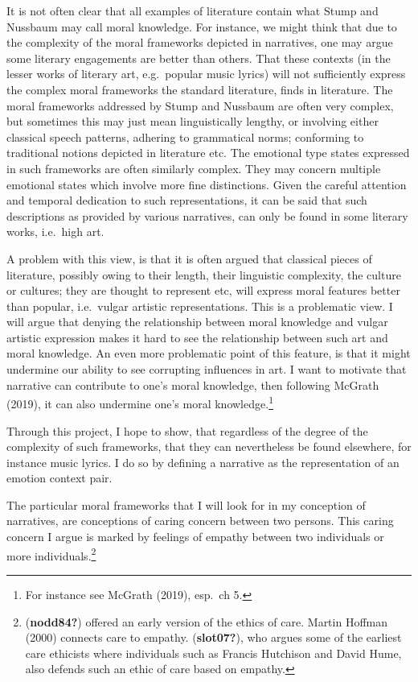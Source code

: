 \documentclass[12pt]{book}
\theoremstyle{definition}
\theoremstyle{remark}
\begin{document}
It is not often clear that all examples of literature contain what Stump and Nussbaum may call moral knowledge. For instance, we might think that due to the complexity of the moral frameworks depicted in narratives, one may argue some literary engagements are better than others. That these contexts (in the lesser works of literary art, e.g.~popular music lyrics) will not sufficiently express the complex moral frameworks the standard literature, finds in literature. The moral frameworks addressed by Stump and Nussbaum are often very complex, but sometimes this may just mean linguistically lengthy, or involving either classical speech patterns, adhering to grammatical norms; conforming to traditional notions depicted in literature etc. The emotional type states expressed in such frameworks are often similarly complex. They may concern multiple emotional states which involve more fine distinctions. Given the careful attention and temporal dedication to such representations, it can be said that such descriptions as provided by various narratives, can only be found in some literary works, i.e.~high art.

A problem with this view, is that it is often argued that classical pieces of literature, possibly owing to their length, their linguistic complexity, the culture or cultures; they are thought to represent etc, will express moral features better than popular, i.e.~vulgar artistic representations. This is a problematic view. I will argue that denying the relationship between moral knowledge and vulgar artistic expression makes it hard to see the relationship between such art and moral knowledge. An even more problematic point of this feature, is that it might undermine our ability to see corrupting influences in art. I want to motivate that narrative can contribute to one's moral knowledge, then following McGrath (2019), it can also undermine one's moral knowledge.\footnote{For instance see McGrath (2019), esp.~ch 5.}

Through this project, I hope to show, that regardless of the degree of the complexity of such frameworks, that they can nevertheless be found elsewhere, for instance music lyrics. I do so by defining a narrative as the representation of an emotion context pair.

The particular moral frameworks that I will look for in my conception of narratives, are conceptions of caring concern between two persons. This caring concern I argue is marked by feelings of empathy between two individuals or more individuals.\footnote{(\textbf{nodd84?}) offered an early version of the ethics of care. Martin Hoffman (2000) connects care to empathy. (\textbf{slot07?}), who argues some of the earliest care ethicists where individuals such as Francis Hutchison and David Hume, also defends such an ethic of care based on empathy.}
\end{document}
